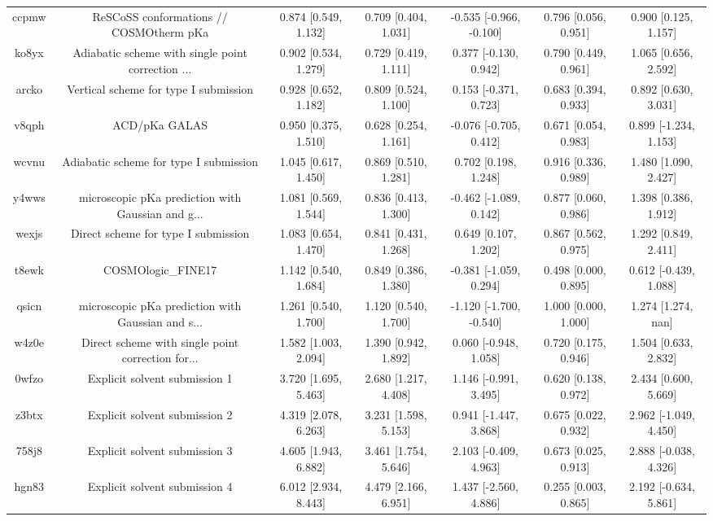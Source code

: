 \documentclass{article}
\begin{document}
\begin{center}
\begin{longtable}{|ccccccc|}
 ccpmw &            ReSCoSS conformations // COSMOtherm pKa &  0.874 [0.549, 1.132] &  0.709 [0.404, 1.031] &  -0.535 [-0.966, -0.100] &  0.796 [0.056, 0.951] &   0.900 [0.125, 1.157] \\
 ko8yx &  Adiabatic scheme with single point correction ... &  0.902 [0.534, 1.279] &  0.729 [0.419, 1.111] &    0.377 [-0.130, 0.942] &  0.790 [0.449, 0.961] &   1.065 [0.656, 2.592] \\
 arcko &              Vertical scheme for type I submission &  0.928 [0.652, 1.182] &  0.809 [0.524, 1.100] &    0.153 [-0.371, 0.723] &  0.683 [0.394, 0.933] &   0.892 [0.630, 3.031] \\
 v8qph &                                      ACD/pKa GALAS &  0.950 [0.375, 1.510] &  0.628 [0.254, 1.161] &   -0.076 [-0.705, 0.412] &  0.671 [0.054, 0.983] &  0.899 [-1.234, 1.153] \\
 wcvnu &             Adiabatic scheme for type I submission &  1.045 [0.617, 1.450] &  0.869 [0.510, 1.281] &     0.702 [0.198, 1.248] &  0.916 [0.336, 0.989] &   1.480 [1.090, 2.427] \\
 y4wws &  microscopic pKa prediction with Gaussian and g... &  1.081 [0.569, 1.544] &  0.836 [0.413, 1.300] &   -0.462 [-1.089, 0.142] &  0.877 [0.060, 0.986] &   1.398 [0.386, 1.912] \\
 wexjs &                Direct scheme for type I submission &  1.083 [0.654, 1.470] &  0.841 [0.431, 1.268] &     0.649 [0.107, 1.202] &  0.867 [0.562, 0.975] &   1.292 [0.849, 2.411] \\
 t8ewk &                                 COSMOlogic\_FINE17 &  1.142 [0.540, 1.684] &  0.849 [0.386, 1.380] &   -0.381 [-1.059, 0.294] &  0.498 [0.000, 0.895] &  0.612 [-0.439, 1.088] \\
 qsicn &  microscopic pKa prediction with Gaussian and s... &  1.261 [0.540, 1.700] &  1.120 [0.540, 1.700] &  -1.120 [-1.700, -0.540] &  1.000 [0.000, 1.000] &     1.274 [1.274, nan] \\
 w4z0e &  Direct scheme with single point correction for... &  1.582 [1.003, 2.094] &  1.390 [0.942, 1.892] &    0.060 [-0.948, 1.058] &  0.720 [0.175, 0.946] &   1.504 [0.633, 2.832] \\
 0wfzo &                      Explicit solvent submission 1 &  3.720 [1.695, 5.463] &  2.680 [1.217, 4.408] &    1.146 [-0.991, 3.495] &  0.620 [0.138, 0.972] &   2.434 [0.600, 5.669] \\
 z3btx &                      Explicit solvent submission 2 &  4.319 [2.078, 6.263] &  3.231 [1.598, 5.153] &    0.941 [-1.447, 3.868] &  0.675 [0.022, 0.932] &  2.962 [-1.049, 4.450] \\
 758j8 &                      Explicit solvent submission 3 &  4.605 [1.943, 6.882] &  3.461 [1.754, 5.646] &    2.103 [-0.409, 4.963] &  0.673 [0.025, 0.913] &  2.888 [-0.038, 4.326] \\
 hgn83 &                      Explicit solvent submission 4 &  6.012 [2.934, 8.443] &  4.479 [2.166, 6.951] &    1.437 [-2.560, 4.886] &  0.255 [0.003, 0.865] &  2.192 [-0.634, 5.861] \\
\end{longtable}
\end{center}
\end{document}
